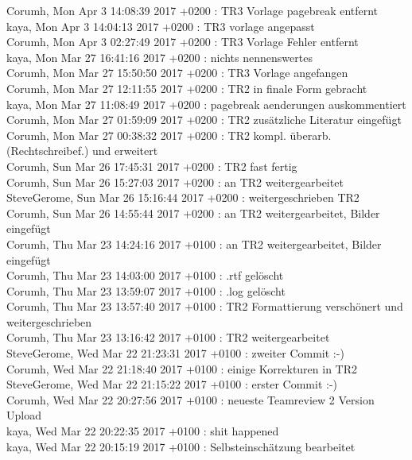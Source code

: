 Corumh, Mon Apr 3 14:08:39 2017 +0200 : TR3 Vorlage pagebreak entfernt\\
kaya, Mon Apr 3 14:04:13 2017 +0200 : TR3 vorlage angepasst\\
Corumh, Mon Apr 3 02:27:49 2017 +0200 : TR3 Vorlage Fehler entfernt\\
kaya, Mon Mar 27 16:41:16 2017 +0200 : nichts nennenswertes\\
Corumh, Mon Mar 27 15:50:50 2017 +0200 : TR3 Vorlage angefangen\\
Corumh, Mon Mar 27 12:11:55 2017 +0200 : TR2 in finale Form gebracht\\
kaya, Mon Mar 27 11:08:49 2017 +0200 : pagebreak aenderungen auskommentiert\\
Corumh, Mon Mar 27 01:59:09 2017 +0200 : TR2 zusätzliche Literatur eingefügt\\
Corumh, Mon Mar 27 00:38:32 2017 +0200 : TR2 kompl. überarb. (Rechtschreibef.) und erweitert\\
Corumh, Sun Mar 26 17:45:31 2017 +0200 : TR2 fast fertig\\
Corumh, Sun Mar 26 15:27:03 2017 +0200 : an TR2 weitergearbeitet\\
SteveGerome, Sun Mar 26 15:16:44 2017 +0200 : weitergeschrieben TR2\\
Corumh, Sun Mar 26 14:55:44 2017 +0200 : an TR2 weitergearbeitet, Bilder eingefügt\\
Corumh, Thu Mar 23 14:24:16 2017 +0100 : an TR2 weitergearbeitet, Bilder eingefügt\\
Corumh, Thu Mar 23 14:03:00 2017 +0100 : .rtf gelöscht\\
Corumh, Thu Mar 23 13:59:07 2017 +0100 : .log gelöscht\\
Corumh, Thu Mar 23 13:57:40 2017 +0100 : TR2 Formattierung verschönert und weitergeschrieben\\
Corumh, Thu Mar 23 13:16:42 2017 +0100 : TR2 weitergearbeitet\\
SteveGerome, Wed Mar 22 21:23:31 2017 +0100 : zweiter Commit :-)\\
Corumh, Wed Mar 22 21:18:40 2017 +0100 : einige Korrekturen in TR2\\
SteveGerome, Wed Mar 22 21:15:22 2017 +0100 : erster Commit :-)\\
Corumh, Wed Mar 22 20:27:56 2017 +0100 : neueste Teamreview 2 Version Upload\\
kaya, Wed Mar 22 20:22:35 2017 +0100 : shit happened\\
kaya, Wed Mar 22 20:15:19 2017 +0100 : Selbsteinschätzung bearbeitet\\
